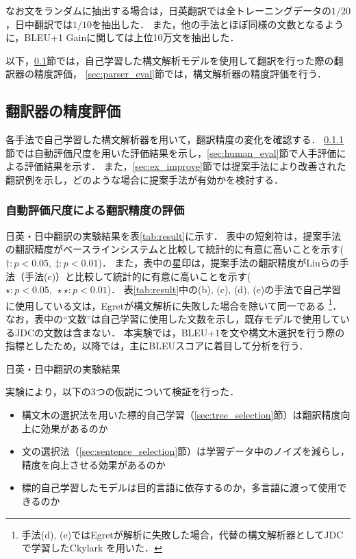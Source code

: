 \documentclass[japanese]{jnlp_1.4}
\begin{document}
なお文をランダムに抽出する場合は，日英翻訳では全トレーニングデータの$1/20$，日中翻訳では$1/10$を抽出した．
また，他の手法とほぼ同様の文数となるように，BLEU+1 Gainに関しては上位10万文を抽出した．

以下，\ref{sec:mt_eval}節では，自己学習した構文解析モデルを使用して翻訳を行った際の翻訳器の精度評価，
\ref{sec:parser_eval}節では，構文解析器の精度評価を行う．


\subsection{翻訳器の精度評価}
\label{sec:mt_eval}

各手法で自己学習した構文解析器を用いて，翻訳精度の変化を確認する．
\ref{sec:automatic_eval}節では自動評価尺度を用いた評価結果を示し，\ref{sec:human_eval}節で人手評価による評価結果を示す．
また，\ref{sec:ex_improve}節では提案手法により改善された翻訳例を示し，どのような場合に提案手法が有効かを検討する．


\subsubsection{自動評価尺度による翻訳精度の評価}
\label{sec:automatic_eval}

日英・日中翻訳の実験結果を表\ref{tab:result}に示す．
表中の短剣符は，提案手法の翻訳精度がベースラインシステムと比較して統計的に有意に高いことを示す($\dag:p<0.05,\ \ddag:p<0.01$)．
また，表中の星印は，提案手法の翻訳精度がLiuらの手法（手法(c)）と比較して統計的に有意に高いことを示す($\star:p<0.05,\ \star\star:p<0.01$)．
表\ref{tab:result}中の(b), (c), (d), (e)の手法で自己学習に使用している文は，Egretが構文解析に失敗した場合を除いて同一である
\footnote{手法(d), (e)ではEgretが解析に失敗した場合，代替の構文解析器としてJDCで学習したCkylark \cite{oda15naacldemo} を用いた．}．
なお，表中の``文数''は自己学習に使用した文数を示し，既存モデルで使用しているJDCの文数は含まない．
本実験では，BLEU+1を文や構文木選択を行う際の指標としたため，以降では，主にBLEUスコアに着目して分析を行う．

\begin{table}[b] 
\caption{日英・日中翻訳の実験結果}
\label{tab:result}

\end{table}

実験により，以下の3つの仮説について検証を行った．
\begin{itemize}
\item 構文木の選択法を用いた標的自己学習（\ref{sec:tree_selection}節）は翻訳精度向上に効果があるのか
\item 文の選択法（\ref{sec:sentence_selection}節）は学習データ中のノイズを減らし，精度を向上させる効果があるのか
\item 標的自己学習したモデルは目的言語に依存するのか，多言語に渡って使用できるのか
\end{itemize}
\end{document}
